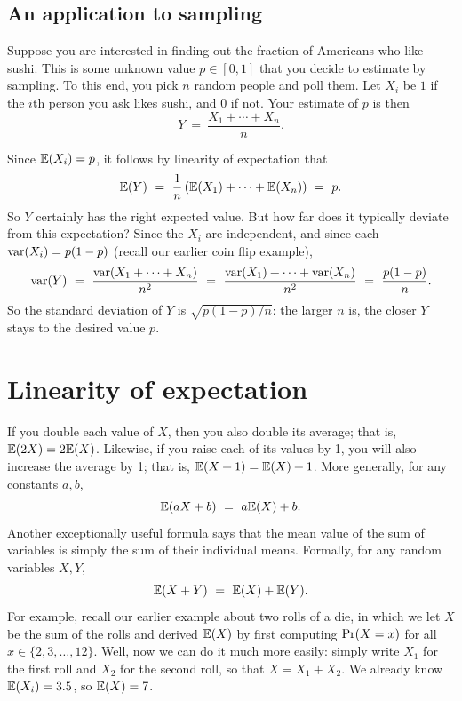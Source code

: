 \subsection{An application to sampling}

Suppose you are interested in finding out the fraction of Americans who like sushi. 
This is some unknown value $p \in [0,1]$ that you decide to estimate by sampling.
To this end, you pick $n$ random people and poll them. Let $X_i$ be $1$ if the $i$th
person you ask likes sushi, and $0$ if not. Your estimate of $p$ is then
$$ Y \ = \ \frac{X_1 + \cdots + X_n}{n}.$$

Since $\mathbb{E}(X_i) = p$, it follows by linearity of expectation that
$$
\E(Y)
\ = \ 
\frac{1}{n} \left( \E(X_1) + \cdots + \E(X_n) \right)
\ = \ 
p.
$$
So $Y$ certainly has the right expected value. But how far does it typically
deviate from this expectation? Since the $X_i$ are independent, and since
each $\mbox{\rm var}(X_i) = p(1-p)$ (recall our earlier coin flip example), 
$$ 
\var(Y) 
\ = \ 
\frac{\var(X_1 + \cdots + X_n)}{n^2}
\ = \ 
\frac{\var(X_1) + \cdots + \var(X_n)}{n^2}  
\ = \ 
\frac{p(1-p)}{n}.
$$
So the standard deviation of $Y$ is $\sqrt{p(1-p)/n}$: the larger $n$ is,
the closer $Y$ stays to the desired value $p$.

\section{Linearity of expectation}

If you double each value of $X$, then you also double its average; that is, 
$\mathbb{E}(2X) = 2 \mathbb{E}(X)$. Likewise, if you raise each of its values by 1, you will
also increase the average by 1; that is, $\mathbb{E}(X+1) = \mathbb{E}(X) + 1$. More generally,
for any constants $a,b$,
$$ \mathbb{E}(aX + b) \ = \ a\mathbb{E}(X) + b.$$
Another exceptionally useful formula says that the mean value of the sum of
variables is simply the sum of their individual means. Formally, for 
any random variables $X, Y$,
$$ \mathbb{E}(X+Y) \ = \ \mathbb{E}(X) + \mathbb{E}(Y).$$
For example, recall our earlier example about two
rolls of a die, in which we let $X$ be the sum of the rolls and derived $\mathbb{E}(X)$
by first computing $\mbox{\rm Pr}(X = x)$ for all $x \in \{2,3,\ldots,12\}$. Well, now
we can do it much more easily: simply write $X_1$ for the first roll and $X_2$
for the second roll, so that $X = X_1 + X_2$. We already know $\mathbb{E}(X_i) = 3.5$,
so $\mathbb{E}(X) = 7$.

